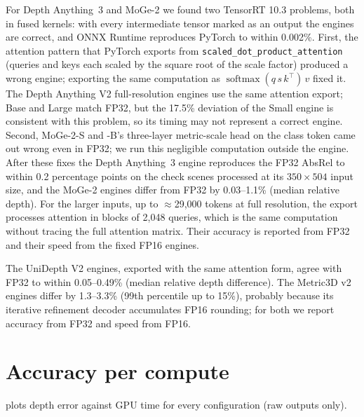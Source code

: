 \documentclass[10pt,twocolumn]{article}
\begin{document}
For Depth Anything~3 and MoGe-2 we found two TensorRT 10.3 problems, both in fused kernels: with
every intermediate tensor marked as an output the engines are correct, and ONNX Runtime reproduces
PyTorch to within 0.002\%. First, the attention pattern that PyTorch exports from
\texttt{scaled\_dot\_product\_attention} (queries and keys each scaled by the square root of the scale
factor) produced a wrong engine; exporting the same computation as
$\operatorname{softmax}(q\,s\,k^{\top})\,v$ fixed it. The Depth Anything V2 full-resolution
engines use the same attention export; Base and Large match FP32, but the 17.5\% deviation of the
Small engine is consistent with this problem, so its timing may not represent a correct engine. Second, MoGe-2-S and -B's three-layer metric-scale
head on the class token came out wrong even in FP32; we run this negligible computation outside the
engine. After these fixes the Depth Anything~3 engine reproduces the FP32 AbsRel to within
0.2 percentage points on the check scenes processed at its $350\times504$ input size, and the MoGe-2
engines differ from FP32 by 0.03--1.1\% (median relative depth). For the larger inputs, up to
${\approx}$29{,}000 tokens at full resolution, the export processes attention in blocks of 2{,}048
queries, which is the same computation without tracing the full attention matrix. Their accuracy is reported from FP32 and their speed from the fixed FP16 engines.

The UniDepth V2 engines, exported with the same attention form, agree with FP32 to within 0.05--0.49\%
(median relative depth difference). The Metric3D v2 engines differ by 1.3--3.3\% (99th percentile up
to 15\%), probably because its iterative refinement decoder accumulates FP16 rounding; for both we
report accuracy from FP32 and speed from FP16.

\section{Accuracy per compute}
\label{sec:compute}
 plots depth error against GPU time for every configuration (raw outputs only).
\end{document}

